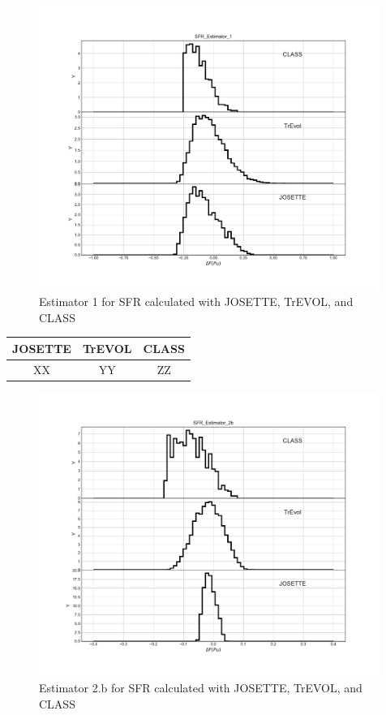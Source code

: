\begin{figure}[h]
	\begin{center}
		\includegraphics[width = 0.99\textwidth]{../../Feature_1/RAW_DATA/FIG/SFR_Estimator_1.pdf}
		\caption{Estimator 1 for SFR calculated with JOSETTE, TrEVOL, and CLASS}
		\label{fig:Est1_SFR}
	\end{center}
\end{figure}

\begin{table}[h]
	\begin{center}
		\begin{tabular}{|c||c||c|}
			\hline 
				JOSETTE & TrEVOL & CLASS \\
			\hline
				XX & YY & ZZ \\
		\end{tabular}
	\end{center}
	\label{table:Est1Dev_SFR}
\end{table}

\begin{figure}[h]
	\begin{center}
		\includegraphics[width = 0.99\textwidth]{../../Feature_1/RAW_DATA/FIG/SFR_Estimator_2b.pdf}
		\caption{Estimator 2.b for SFR calculated with JOSETTE, TrEVOL, and CLASS}
		\label{fig:Est2_SFR}
	\end{center}
\end{figure}
